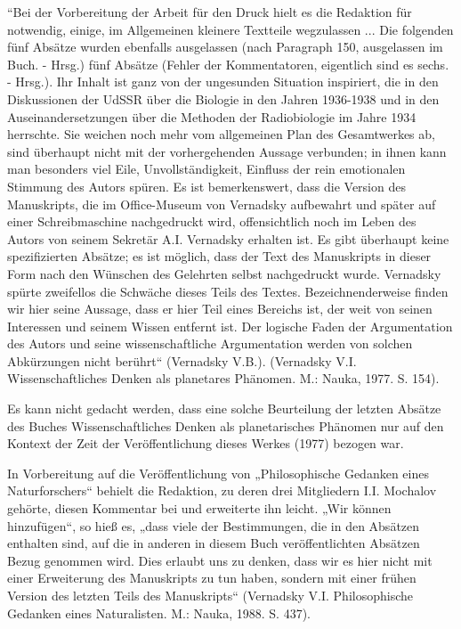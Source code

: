 \documentclass[11pt,a4paper]{article}
\begin{document}
“Bei der Vorbereitung der Arbeit für den Druck hielt es die Redaktion für
notwendig, einige, im Allgemeinen kleinere Textteile wegzulassen ... Die
folgenden fünf Absätze wurden ebenfalls ausgelassen (nach Paragraph 150,
ausgelassen im Buch. - Hrsg.) fünf Absätze (Fehler der Kommentatoren,
eigentlich sind es sechs. - Hrsg.). Ihr Inhalt ist ganz von der ungesunden
Situation inspiriert, die in den Diskussionen der UdSSR über die Biologie in
den Jahren 1936-1938 und in den Auseinandersetzungen über die Methoden der
Radiobiologie im Jahre 1934 herrschte. Sie weichen noch mehr vom allgemeinen
Plan des Gesamtwerkes ab, sind überhaupt nicht mit der vorhergehenden Aussage
verbunden; in ihnen kann man besonders viel Eile, Unvollständigkeit, Einfluss
der rein emotionalen Stimmung des Autors spüren. Es ist bemerkenswert, dass
die Version des Manuskripts, die im Office-Museum von Vernadsky aufbewahrt und
später auf einer Schreibmaschine nachgedruckt wird, offensichtlich noch im
Leben des Autors von seinem Sekretär A.I. Vernadsky erhalten ist. Es gibt
überhaupt keine spezifizierten Absätze; es ist möglich, dass der Text des
Manuskripts in dieser Form nach den Wünschen des Gelehrten selbst nachgedruckt
wurde. Vernadsky spürte zweifellos die Schwäche dieses Teils des Textes.
Bezeichnenderweise finden wir hier seine Aussage, dass er hier Teil eines
Bereichs ist, der weit von seinen Interessen und seinem Wissen entfernt ist.
Der logische Faden der Argumentation des Autors und seine wissenschaftliche
Argumentation werden von solchen Abkürzungen nicht berührt“ (Vernadsky V.B.).
(Vernadsky V.I. Wissenschaftliches Denken als planetares Phänomen. M.: Nauka,
1977. S. 154).

Es kann nicht gedacht werden, dass eine solche Beurteilung der letzten Absätze
des Buches Wissenschaftliches Denken als planetarisches Phänomen nur auf den
Kontext der Zeit der Veröffentlichung dieses Werkes (1977) bezogen war.

In Vorbereitung auf die Veröffentlichung von „Philosophische Gedanken eines
Naturforschers“ behielt die Redaktion, zu deren drei Mitgliedern I.I. Mochalov
gehörte, diesen Kommentar bei und erweiterte ihn leicht. „Wir können
hinzufügen“, so hieß es, „dass viele der Bestimmungen, die in den Absätzen
enthalten sind, auf die in anderen in diesem Buch veröffentlichten Absätzen
Bezug genommen wird. Dies erlaubt uns zu denken, dass wir es hier nicht mit
einer Erweiterung des Manuskripts zu tun haben, sondern mit einer frühen
Version des letzten Teils des Manuskripts“ (Vernadsky V.I. Philosophische
Gedanken eines Naturalisten. M.: Nauka, 1988. S. 437).
\end{document}
